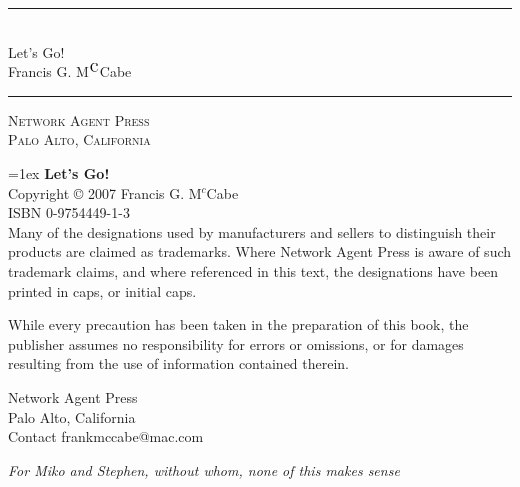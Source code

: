 \documentclass[fleqn,10pt,openright]{book}
\begin{document}
\frontmatter
\thispagestyle{empty}
\newcommand{\HRule}{\rule{\linewidth}{1mm}}
\begin{flushright}
\HRule
\\
\Huge Let's Go!
\\[1ex]
\huge Francis G. M$^{\mbox{\Large c}}$Cabe
\HRule
\end{flushright}
\begin{center}
{\Large\textsc{Network Agent Press}}\\
\textsc{Palo Alto, California}
\end{center}
\newpage{}
\thispagestyle{empty}
{
\parindent=0in
\parskip=1ex
{\bf\large Let's Go!}\\
Copyright \copyright{} 2007 Francis G. M$^c$Cabe\\
ISBN 0-9754449-1-3\\

Many of the designations used by manufacturers and sellers to distinguish their products are claimed as trademarks. Where Network Agent Press is aware of such trademark claims, and where referenced in this text, the designations have been printed in caps, or initial caps.

While every precaution has been taken in the preparation of this book, the publisher assumes no responsibility for errors or omissions, or for damages resulting from the use of information contained therein.

\vspace*{4ex}
Network Agent Press\\
Palo Alto, California\\
Contact frankmccabe@mac.com\\
}

\newpage{}
\pagestyle{empty}
\begin{center}
\emph{For Miko and Stephen, without whom, none of this makes sense}
\end{center}

\cleardoublepage

\pagestyle{fancy}
\renewcommand{\chaptermark}[1]{\markboth{\thechapter\ #1}{}} \renewcommand{\sectionmark}[1]{\markright{\thesection\ #1}}
\fancyhf{} %
\fancyhead[LE,RO]{\bfseries\thepage}
\fancyhead[LO]{\bfseries\rightmark}
\fancyhead[RE]{\bfseries\leftmark}
\renewcommand{\headrulewidth}{0.5pt}
\renewcommand{\footrulewidth}{0pt}
\addtolength{\headheight}{0.5pt} %
\end{document}
